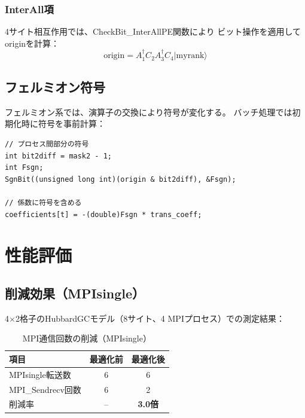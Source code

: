 \documentclass[11pt,a4paper]{article}
\begin{document}
\subsubsection{InterAll項}

4サイト相互作用では、CheckBit\_InterAllPE関数により
ビット操作を適用してoriginを計算：
\begin{equation}
  \text{origin} = A^\dagger_1 C_2 A^\dagger_3 C_4 |\text{myrank}\rangle
\end{equation}

\subsection{フェルミオン符号}

フェルミオン系では、演算子の交換により符号が変化する。
バッチ処理では初期化時に符号を事前計算：

\begin{lstlisting}[caption=フェルミオン符号の事前計算]
// プロセス間部分の符号
int bit2diff = mask2 - 1;
int Fsgn;
SgnBit((unsigned long int)(origin & bit2diff), &Fsgn);

// 係数に符号を含める
coefficients[t] = -(double)Fsgn * trans_coeff;
\end{lstlisting}

\section{性能評価}

\subsection{削減効果（MPIsingle）}

4$\times$2格子のHubbardGCモデル（8サイト、4 MPIプロセス）での測定結果：

\begin{table}[h]
\centering
\begin{tabular}{lcc}
\toprule
項目 & 最適化前 & 最適化後 \\
\midrule
MPIsingle転送数 & 6 & 6 \\
MPI\_Sendrecv回数 & 6 & 2 \\
削減率 & -- & \textbf{3.0倍} \\
\bottomrule
\end{tabular}
\caption{MPI通信回数の削減（MPIsingle）}
\end{table}
\end{document}
